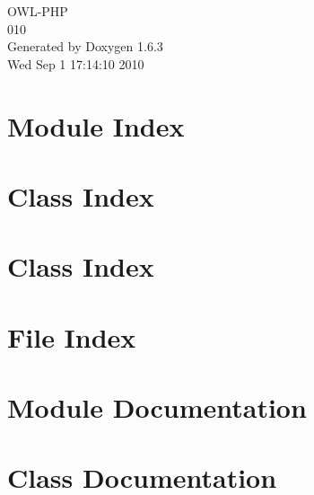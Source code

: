 \documentclass[a4paper]{book}
\begin{document}
\begin{titlepage}
\vspace*{7cm}
\begin{center}
{\Large OWL-\/PHP \\[1ex]\large 010 }\\
\vspace*{1cm}
{\large Generated by Doxygen 1.6.3}\\
\vspace*{0.5cm}
{\small Wed Sep 1 17:14:10 2010}\\
\end{center}
\end{titlepage}
\clearemptydoublepage
{}
\tableofcontents
\clearemptydoublepage
{}
\chapter{Module Index}

\chapter{Class Index}

\chapter{Class Index}

\chapter{File Index}

\chapter{Module Documentation}




\chapter{Class Documentation}



















\end{document}
